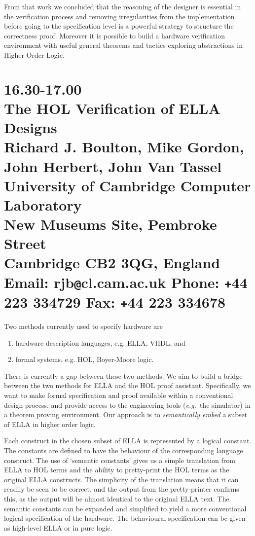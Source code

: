         From that work we concluded that the reasoning of the designer
is essential in the verification process and removing irregularities
from the implementation before going to the specification level is a
powerful strategy to structure the correctness proof. Moreover it is
possible to build a hardware verification environment with useful
general theorems and tactics exploring abstractions in Higher Order
Logic.

\newpage
\section*{16.30-17.00\\
The HOL Verification of ELLA Designs\\
Richard J. Boulton, Mike Gordon, John Herbert, John Van Tassel\\
\large\bf University of Cambridge Computer Laboratory\\
New Museums Site, Pembroke Street\\
Cambridge CB2 3QG, England\\
\normalsize\bf
Email: rjb{\tt @}cl.cam.ac.uk\quad
Phone: {\tt +}44 223 334729\quad
Fax: {\tt +}44 223 334678}

Two methods currently used to specify hardware are
\begin{enumerate}
\item  hardware description languages, e.g. ELLA, VHDL, and
\item formal systems, e.g. HOL, Boyer-Moore logic.
\end{enumerate}
There is currently a gap between these two methods.
We aim to build a bridge between the two methods for ELLA and the HOL proof
assistant. Specifically, we want to make formal specification and proof
available within a conventional design process, and provide access to the
engineering tools ({\it e.g.}~the simulator) in a theorem proving environment.
Our approach is to {\it semantically embed\/} a subset of ELLA in higher order
logic.

Each construct in the chosen subset of ELLA is represented by a logical
constant. The constants are defined to have the behaviour of the corresponding
language construct. The use of `semantic constants' gives us a simple
translation from ELLA to HOL terms and the ability to pretty-print the HOL
terms as the original ELLA constructs. The simplicity of the translation means
that it can readily be seen to be correct, and the output from the
pretty-printer confirms this, as the output will be almost identical to the
original ELLA text. The semantic constants can be expanded and simplified to
yield a more conventional logical specification of the hardware. The
behavioural specification can be given as high-level ELLA or in pure logic.


